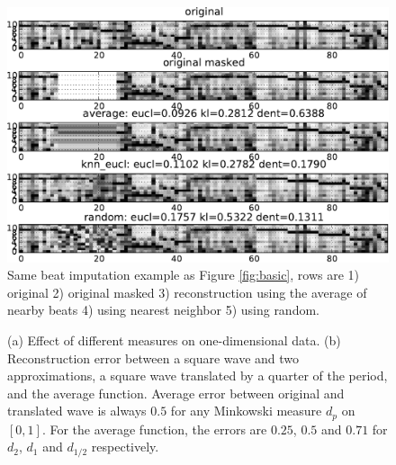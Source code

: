 \documentclass{article}
\begin{document}
\begin{figure}[t]
\begin{center}
\includegraphics[width=.95\columnwidth]{avg_nn_rand}
\end{center}
\caption{Same beat imputation example as Figure \ref{fig:basic}, 
rows are 1) original 2) original masked
3) reconstruction using the average of nearby beats 4) using
nearest neighbor 5) using random.
\label{fig:avgnnrand}}
\end{figure}


\begin{figure}%
\centering
{} 
\hspace{0.1cm}
%
\hspace{8pt}%
\caption{(a) Effect of different measures on one-dimensional data. (b)
  Reconstruction error between a square wave and two approximations, a
  square wave translated by a quarter of the period, and the average
  function. Average error between original and translated wave is
  always $0.5$ for any Minkowski measure $d_p$ on $[0,1]$.  For the
  average function, the errors are $0.25$, $0.5$ and $0.71$ for $d_2$,
  $d_1$ and $d_{1/2}$ respectively.}%
\label{fig:two_measures}
\end{figure}
\end{document}
